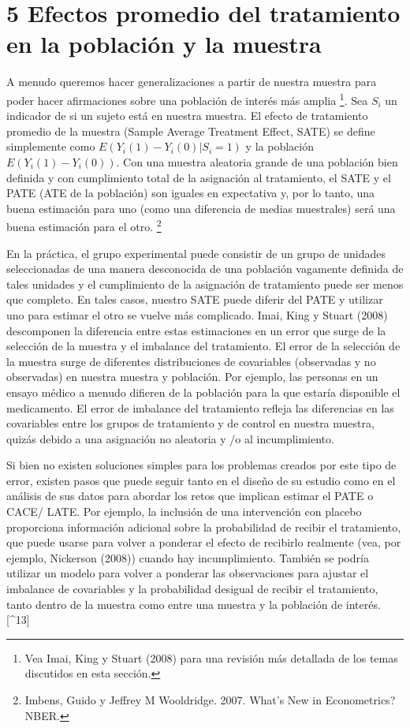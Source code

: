 \documentclass[
]{article}
\begin{document}
\hypertarget{efectos-promedio-del-tratamiento-en-la-poblaciuxf3n-y-la-muestra}{%
\section{5 Efectos promedio del tratamiento en la población y la
muestra}\label{efectos-promedio-del-tratamiento-en-la-poblaciuxf3n-y-la-muestra}}

A menudo queremos hacer generalizaciones a partir de nuestra muestra
para poder hacer afirmaciones sobre una población de interés más amplia
\footnote{Vea Imai, King y Stuart (2008) para una revisión más detallada
  de los temas discutidos en esta sección.}. Sea \(S_i\) un indicador de
si un sujeto está en nuestra muestra. El efecto de tratamiento promedio
de la muestra (Sample Average Treatment Effect, SATE) se define
simplemente como \(E(Y_i (1) -Y_i(0) | S_i = 1)\) y la población
\(E(Y_i (1) -Y_i (0))\). Con una muestra aleatoria grande de una
población bien definida y con cumplimiento total de la asignación al
tratamiento, el SATE y el PATE (ATE de la población) son iguales en
expectativa y, por lo tanto, una buena estimación para uno (como una
diferencia de medias muestrales) será una buena estimación para el otro.
\footnote{Imbens, Guido y Jeffrey M Wooldridge. 2007. What's New in
  Econometrics? NBER.}

En la práctica, el grupo experimental puede consistir de un grupo de
unidades seleccionadas de una manera desconocida de una población
vagamente definida de tales unidades y el cumplimiento de la asignación
de tratamiento puede ser menos que completo. En tales casos, nuestro
SATE puede diferir del PATE y utilizar uno para estimar el otro se
vuelve más complicado. Imai, King y Stuart (2008) descomponen la
diferencia entre estas estimaciones en un error que surge de la
selección de la muestra y el imbalance del tratamiento. El error de la
selección de la muestra surge de diferentes distribuciones de
covariables (observadas y no observadas) en nuestra muestra y población.
Por ejemplo, las personas en un ensayo médico a menudo difieren de la
población para la que estaría disponible el medicamento. El error de
imbalance del tratamiento refleja las diferencias en las covariables
entre los grupos de tratamiento y de control en nuestra muestra, quizás
debido a una asignación no aleatoria y /o al incumplimiento.

Si bien no existen soluciones simples para los problemas creados por
este tipo de error, existen pasos que puede seguir tanto en el diseño de
su estudio como en el análisis de sus datos para abordar los retos que
implican estimar el PATE o CACE/ LATE. Por ejemplo, la inclusión de una
intervención con placebo proporciona información adicional sobre la
probabilidad de recibir el tratamiento, que puede usarse para volver a
ponderar el efecto de recibirlo realmente (vea, por ejemplo, Nickerson
(2008)) cuando hay incumplimiento. También se podría utilizar un modelo
para volver a ponderar las observaciones para ajustar el imbalance de
covariables y la probabilidad desigual de recibir el tratamiento, tanto
dentro de la muestra como entre una muestra y la población de interés.
{[}\^{}13{]}
\end{document}

